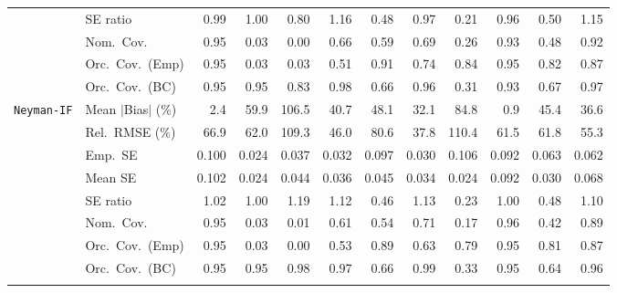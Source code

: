 \begin{landscape}
\begin{longtable}{llrrrrrrrrrr}
 & SE ratio & \cellcolor{ranktwo}0.99 & \cellcolor{rankone}1.00 & 0.80 & 1.16 & 0.48 & \cellcolor{rankthree}0.97 & 0.21 & 0.96 & 0.50 & 1.15 \\
 & Nom.\ Cov. & \cellcolor{rankone}0.95 & 0.03 & 0.00 & 0.66 & 0.59 & 0.69 & 0.26 & \cellcolor{ranktwo}0.93 & 0.48 & \cellcolor{rankthree}0.92 \\
 & Orc.\ Cov.\ (Emp) & \cellcolor{rankone}0.95 & 0.03 & 0.03 & 0.51 & \cellcolor{rankthree}0.91 & 0.74 & 0.84 & \cellcolor{ranktwo}0.95 & 0.82 & 0.87 \\
 & Orc.\ Cov.\ (BC) & \cellcolor{rankone}0.95 & \cellcolor{ranktwo}0.95 & 0.83 & 0.98 & 0.66 & \cellcolor{rankthree}0.96 & 0.31 & 0.93 & 0.67 & 0.97 \\
\addlinespace[2pt]
\quad \texttt{Neyman-IF} & Mean $|$Bias$|$ (\%) & \cellcolor{ranktwo}2.4 & 59.9 & 106.5 & 40.7 & 48.1 & \cellcolor{rankthree}32.1 & 84.8 & \cellcolor{rankone}0.9 & 45.4 & 36.6 \\
 & Rel.\ RMSE (\%) & 66.9 & 62.0 & 109.3 & \cellcolor{ranktwo}46.0 & 80.6 & \cellcolor{rankone}37.8 & 110.4 & 61.5 & 61.8 & \cellcolor{rankthree}55.3 \\
 & Emp.\ SE & 0.100 & 0.024 & 0.037 & 0.032 & 0.097 & 0.030 & 0.106 & 0.092 & 0.063 & 0.062 \\
 & Mean SE & 0.102 & 0.024 & 0.044 & 0.036 & 0.045 & 0.034 & 0.024 & 0.092 & 0.030 & 0.068 \\
 & SE ratio & \cellcolor{rankthree}1.02 & \cellcolor{rankone}1.00 & 1.19 & 1.12 & 0.46 & 1.13 & 0.23 & \cellcolor{ranktwo}1.00 & 0.48 & 1.10 \\
 & Nom.\ Cov. & \cellcolor{rankone}0.95 & 0.03 & 0.01 & 0.61 & 0.54 & 0.71 & 0.17 & \cellcolor{ranktwo}0.96 & 0.42 & \cellcolor{rankthree}0.89 \\
 & Orc.\ Cov.\ (Emp) & \cellcolor{ranktwo}0.95 & 0.03 & 0.00 & 0.53 & \cellcolor{rankthree}0.89 & 0.63 & 0.79 & \cellcolor{rankone}0.95 & 0.81 & 0.87 \\
 & Orc.\ Cov.\ (BC) & \cellcolor{rankone}0.95 & \cellcolor{rankthree}0.95 & 0.98 & 0.97 & 0.66 & 0.99 & 0.33 & \cellcolor{ranktwo}0.95 & 0.64 & 0.96 \\
\addlinespace[2pt]
\end{longtable}
\end{landscape}
